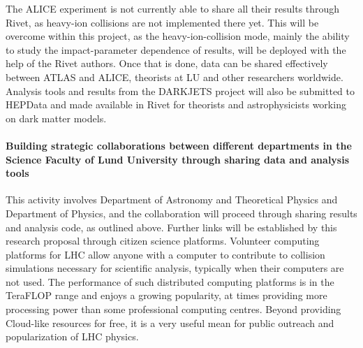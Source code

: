 \documentclass[a4paper,justified]{tufte-handout}
\begin{document}
The ALICE experiment is not currently able to share all their results through
Rivet, as heavy-ion collisions are not implemented there yet. This will be
overcome within this project, as the heavy-ion-collision mode, mainly the
ability to study the impact-parameter dependence of results, will be deployed
with the help of the Rivet authors. Once that is done, data can be shared
effectively between ATLAS and ALICE, theorists at LU and other
researchers worldwide. Analysis tools and results from the DARKJETS project
will also be submitted to HEPData and made available in Rivet for theorists
and astrophysicists working on dark matter models.


\vspace{-10px}
\paragraph{Building strategic collaborations between different departments in the Science Faculty of Lund University through sharing data and analysis tools} %

This activity involves Department of Astronomy and Theoretical Physics and Department of Physics, and the collaboration will proceed through sharing results and analysis code, as outlined above. Further links will be established by this research proposal through citizen science platforms. 
Volunteer computing platforms for LHC allow anyone with a computer to contribute to collision simulations necessary for scientific analysis, typically when their computers are not used. The performance of such distributed computing platforms is in the TeraFLOP range and enjoys a growing popularity, at times providing more processing power than some professional computing centres. Beyond providing Cloud-like resources for free, it is a very useful mean for public outreach and popularization of LHC physics.
\end{document}
